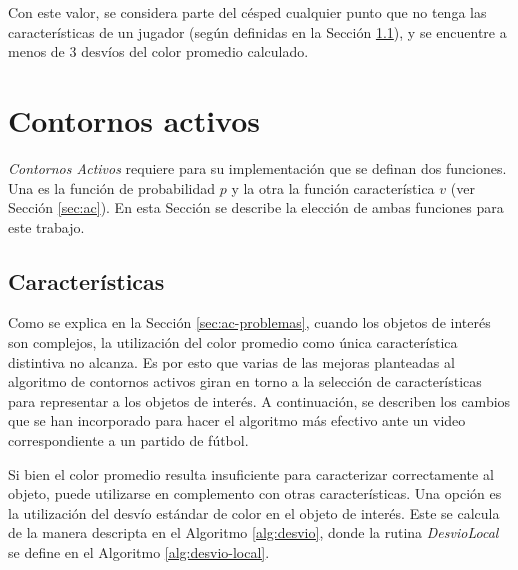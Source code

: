 Con este valor, se considera parte del césped cualquier punto que no tenga las
características de un jugador (según definidas en la Sección
\ref{sec:caracteristicas}), y se encuentre a menos de $3$ desvíos del color
promedio calculado.

\section{Contornos activos} \label{sec:ac-extension}

\textit{Contornos Activos} requiere para su implementación que se definan dos
funciones. Una es la función de probabilidad $p$ y la otra la función
característica $v$ (ver Sección \ref{sec:ac}). En esta Sección se describe la
elección de ambas funciones para este trabajo.

\subsection{Características}
\label{sec:caracteristicas}

Como se explica en la Sección \ref{sec:ac-problemas}, cuando los objetos de
interés son complejos, la utilización del color promedio como única
característica distintiva no alcanza. Es por esto que varias de las mejoras
planteadas al algoritmo de contornos activos giran en torno a la selección de
características para representar a los objetos de interés. A continuación, se
describen los cambios que se han incorporado para hacer el algoritmo más
efectivo ante un video correspondiente a un partido de fútbol.

Si bien el color promedio resulta insuficiente para caracterizar correctamente
al objeto, puede utilizarse en complemento con otras características. Una opción
es la utilización del desvío estándar de color en el objeto de interés.
Este se calcula de la manera descripta en el Algoritmo \ref{alg:desvio},
donde la rutina \textit{DesvioLocal} se define en el Algoritmo \ref{alg:desvio-local}.

